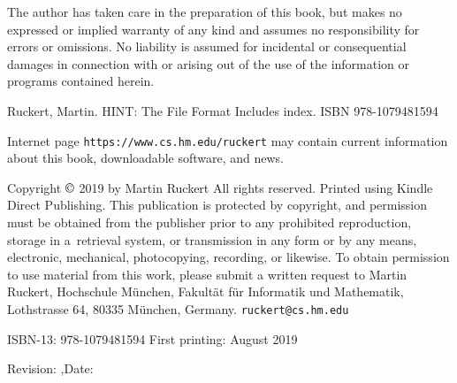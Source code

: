 \titletrue
\begingroup
\figrm
\parindent=0pt
{\raggedright\advance\rightskip 3.5pc
The author has taken care in the preparation of this book,
but makes no expressed or implied warranty of any kind and assumes no
responsibility for errors or omissions. No liability is assumed for
incidental or consequential damages in connection with or arising out
of the use of the information or programs contained herein.

\bigskip
{\figtt\obeylines\obeyspaces\baselineskip=11pt
Ruckert, Martin.
HINT: The File Format
Includes index.
ISBN 978-1079481594
}
\bigskip

{\raggedright\advance\rightskip 3.5pc
\def\:{\discretionary{}{}{}}
Internet page {\tt https:\://www.\:cs.\:hm.\:edu/\:\TL ruckert}
may contain current information about this book, downloadable software,
and news.

\vfill
Copyright $\copyright$ 2019 by Martin Ruckert
\smallskip
All rights reserved.
Printed using Kindle Direct Publishing.
This publication is protected by copyright, and permission must be
obtained from the publisher prior to any prohibited reproduction, storage in
a~retrieval system, or transmission in any form or by any means, electronic,
mechanical, photocopying, recording, or likewise.
To obtain permission to use material from this work, please submit a written
request to Martin Ruckert,
Hochschule M\"unchen,
Fakult\"at f\"ur Informatik und Mathematik,
Lothstrasse 64,
80335 M\"unchen,
Germany.
\medskip
{\tt ruckert\:@cs.hm.edu}
\medskip

ISBN-13: 978-\:1079481594
\medskip
First printing: August 2019\par
\medskip
Revision: \lastrevision,\quad Date: \lastdate\par
}
}
\endgroup


\frontmatter



